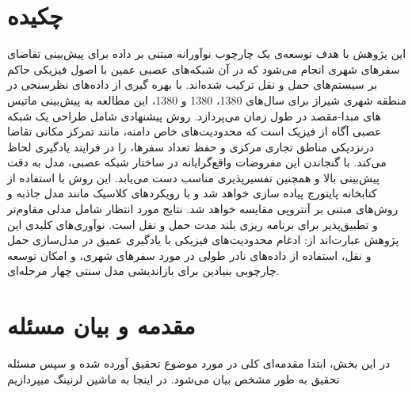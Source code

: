 \documentclass{titlepage}
\begin{document}
\maketitle  %

\setcounter{page}{1}

\section*{چکیده}
این پژوهش با هدف توسعه‌ی یک چارچوب نوآورانه مبتنی بر داده برای پیش‌بینی تقاضای سفرهای شهری انجام می‌شود که در آن شبکه‌های عصبی عمین با اصول فیزیکی حاکم بر سیستم‌های حمل و نقل ترکیب شده‌اند. با بهره گیری از داده‌های  نظرسنجی در منطقه شهری شیراز برای سال‌های 1380، 1380 و 1380، این مطالعه به پیش‌بینی ماتیس ‌های مبدا-مقصد  در طول زمان می‌پردازد. روش پیشنهادی شامل طراحی یک شبکه عصبی آگاه از فیزیک  است که محدودیت‌های خاص دامنه، مانند تمرکز مکانی تقاضا درنزدیکی مناطق تجاری مرکزی و حفظ تعداد سفرها، را در فرایند یادگیری لحاظ می‌کند. با گنجاندن این مفروضات واقع‌گرایانه در ساختار شبکه عصبی، مدل به دقت پیش‌بینی بالا و همچنین تفسیرپذیری مناسب دست می‌یابد. این روش با استفاده از کتابخانه پایتورچ  پیاده سازی خواهد شد و با رویکردهای کلاسیک مانند مدل جاذبه‌ و روش‌های مبتنی بر آنتروپی مقایسه خواهد شد. نتایج مورد انتظار شامل مدلی مقاوم‌تر و تطبیق‌پذیر برای برنامه ریزی بلند مدت حمل و نقل است. نوآوری‌های کلیدی این پژوهش عبارت‌اند از: ادغام محدودیت‌های فیزیکی با یادگیری عمیق در مدل‌سازی حمل و نقل، استفاده از داده‌های نادر طولی در مورد سفرهای شهری، و امکان توسعه چارچوبی بنیادین برای بازاندیشی مدل سنتی چهار مرحله‌ای. 
\vfill
\newpage

\tableofcontents
\listoffigures
\listoftables
\clearpage

\setcounter{page}{1}

\section{مقدمه و بیان مسئله}
در این بخش، ابتدا مقدمه‌ای کلی در مورد موضوع تحقیق آورده شده و سپس مسئله تحقیق به طور مشخص بیان می‌شود. در اینجا به ماشین لرنینگ  میپردازیم

\end{document}
